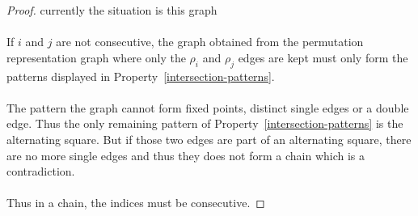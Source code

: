 \begin{proof}
  currently the situation is this graph

  \begin{figure}[H]
    \begin{center}
      \caption{}
    \end{center}
  \end{figure}

  \paragraph{}
  If $i$ and $j$ are not consecutive, the graph obtained from the permutation representation graph where only the $\rho_i$ and $\rho_j$ edges are kept must only form the patterns displayed in Property~\ref{intersection-patterns}.

  \paragraph{}
  The pattern the graph cannot form fixed points, distinct single edges or a double edge. Thus the only remaining pattern of Property~\ref{intersection-patterns} is the alternating square. But if those two edges are part of an alternating square, there are no more single edges and thus they does not form a chain which is a contradiction.

  \paragraph{}
  Thus in a chain, the indices must be consecutive.
\end{proof}

